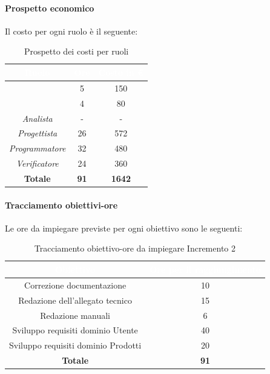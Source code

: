 \paragraph*{Prospetto economico}
Il costo per ogni ruolo è il seguente:
\begin{table}[H]
	\begin{center}
		\begin{tabular}{ |c c c| }
		\rowcolor{darkblue} 
		\textcolor{white}{\textbf{Ruolo}} & \textcolor{white}{\textbf{Ore}} & \textcolor{white}{\textbf{Costo in €}}\\ \hline
		{\Responsabile} 			& 5 	& 150 \\ \hline
		{\Amministratore}		 	& 4 	& 80 \\ \hline
		\textit{Analista} 			& - 	& - \\ \hline
		\textit{Progettista} 		& 26 	& 572 \\ \hline
		\textit{Programmatore}  	& 32 	& 480 \\ \hline
		\textit{Verificatore} 		& 24 	& 360 \\ \hline
		\textbf{Totale} & \textbf{91} & \textbf{1642} \\ \hline
		\end{tabular}
		\caption{Prospetto dei costi per ruoli}
	\end{center}
\end{table}
\paragraph*{Tracciamento obiettivi-ore}
Le ore da impiegare previste per ogni obiettivo sono le seguenti:
\begin{table}[H]
	\begin{center}
		\begin{tabular}{ |c c| }
			\rowcolor{darkblue} 
			\textcolor{white}{\textbf{Obiettivo}}	& \textcolor{white}{\textbf{Ore per il raggiungimento}} \\ \hline
			{Correzione documentazione} 			& 10 	\\ \hline
			{Redazione dell'allegato tecnico} 		& 15 	\\ \hline
			{Redazione manuali} 					& 6 	\\ \hline
			{Sviluppo requisiti dominio Utente} 	& 40 	\\ \hline
			{Sviluppo requisiti dominio Prodotti} 	& 20 	\\ \hline
			\textbf{Totale} 						& \textbf{91}  \\ \hline
		\end{tabular}
		\caption{Tracciamento obiettivo-ore da impiegare Incremento 2}
	\end{center}
\end{table}

